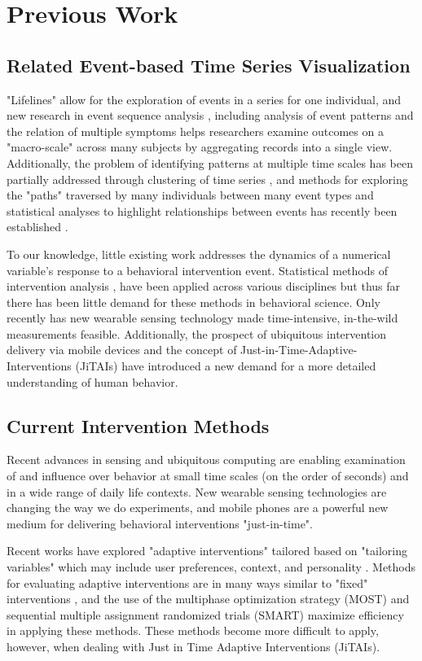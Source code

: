 \section{Previous Work}
\subsection{Related Event-based Time Series Visualization}
"Lifelines" \cite{plaisant1996} allow for the exploration of events in a series for one individual, and new research in event sequence analysis \cite{Wongsuphasawat2011}, including analysis of event patterns \cite{Wongsuphasawat2012, fails2006, vrotsou2007} and the relation of multiple symptoms \cite{wongsuphasawat2011outflow} helps researchers examine outcomes on a "macro-scale" across many subjects by aggregating records into a single view. 
Additionally, the problem of identifying patterns at multiple time scales has been partially addressed through clustering of time series \cite{van1999}, and methods for exploring the "paths" traversed by many individuals between many event types and statistical analyses to highlight relationships between events has recently been established \cite{gotz2014}.

To our knowledge, little existing work addresses the dynamics of a numerical variable's response to a behavioral intervention event. 
Statistical methods of intervention analysis \cite{box1975}, have been applied across various disciplines but thus far there has been little demand for these methods in behavioral science.
Only recently has new wearable sensing technology made time-intensive, in-the-wild measurements feasible.
Additionally, the prospect of ubiquitous intervention delivery via mobile devices and the concept of Just-in-Time-Adaptive-Interventions (JiTAIs) have introduced a new demand for a more detailed understanding of human behavior.

\subsection{Current Intervention Methods}
Recent advances in sensing and ubiquitous computing are enabling examination of and influence over behavior at small time scales (on the order of seconds) and in a wide range of daily life contexts.
New wearable sensing technologies are changing the way we do experiments, and mobile phones are a powerful new medium for delivering behavioral interventions "just-in-time".

Recent works have explored "adaptive interventions" tailored based on "tailoring variables" which may include user preferences, context, and personality \cite{collins2004}. 
Methods for evaluating adaptive interventions are in many ways similar to "fixed" interventions \cite{collins2004}, and the use of the multiphase optimization strategy (MOST) and sequential multiple assignment randomized trials (SMART) \cite{collins2007} maximize efficiency in applying these methods.
These methods become more difficult to apply, however, when dealing with Just in Time Adaptive Interventions (JiTAIs).

